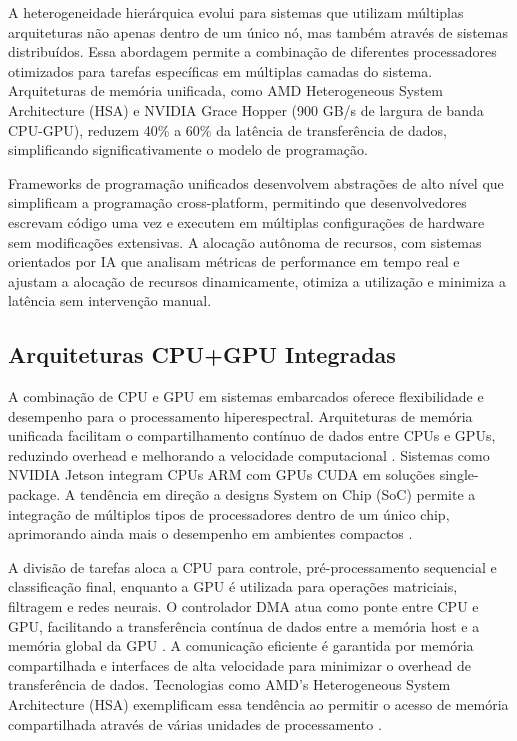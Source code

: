 A heterogeneidade hierárquica evolui para sistemas que utilizam múltiplas
arquiteturas não apenas dentro de um único nó, mas também através de sistemas
distribuídos. Essa abordagem permite a combinação de diferentes processadores
otimizados para tarefas específicas em múltiplas camadas do sistema.
Arquiteturas de memória unificada, como AMD Heterogeneous System Architecture
(HSA) e NVIDIA Grace Hopper (900 GB/s de largura de banda CPU-GPU), reduzem 40\%
a 60\% da latência de transferência de dados, simplificando significativamente o
modelo de programação.

Frameworks de programação unificados desenvolvem abstrações de alto nível que
simplificam a programação cross-platform, permitindo que desenvolvedores
escrevam código uma vez e executem em múltiplas configurações de hardware sem
modificações extensivas. A alocação autônoma de recursos, com sistemas
orientados por IA que analisam métricas de performance em tempo real e ajustam a
alocação de recursos dinamicamente, otimiza a utilização e minimiza a latência
sem intervenção manual.

\subsection{Arquiteturas CPU+GPU Integradas}
\label{subsec:arquiteturas_cpu_gpu}

A combinação de CPU e GPU em sistemas embarcados oferece flexibilidade e
desempenho para o processamento hiperespectral. Arquiteturas de memória
unificada facilitam o compartilhamento contínuo de dados entre CPUs e GPUs,
reduzindo overhead e melhorando a velocidade computacional
\cite{Vaithianathan2025}. Sistemas como NVIDIA Jetson integram CPUs ARM com GPUs
CUDA em soluções single-package. A tendência em direção a designs System on Chip
(SoC) permite a integração de múltiplos tipos de processadores dentro de um
único chip, aprimorando ainda mais o desempenho em ambientes compactos
\cite{Vaithianathan2025}.

A divisão de tarefas aloca a CPU para controle, pré-processamento sequencial e
classificação final, enquanto a GPU é utilizada para operações matriciais,
filtragem e redes neurais. O controlador DMA atua como ponte entre CPU e GPU,
facilitando a transferência contínua de dados entre a memória host e a memória
global da GPU \cite{Vaithianathan2025}. A comunicação eficiente é garantida por
memória compartilhada e interfaces de alta velocidade para minimizar o overhead
de transferência de dados. Tecnologias como AMD's Heterogeneous System
Architecture (HSA) exemplificam essa tendência ao permitir o acesso de memória
compartilhada através de várias unidades de processamento
\cite{Vaithianathan2025}.

